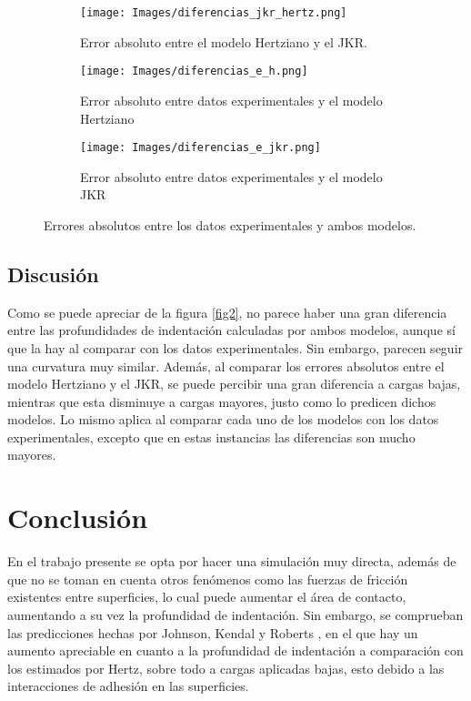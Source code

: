 \documentclass[final,6p,times,twocolumn]{elsarticle}
\begin{document}
\begin{figure}
\centering
    \begin{subfigure}[t]{0.49\textwidth}
         \centering
         \texttt{[image: Images/diferencias\_jkr\_hertz.png]}
         \caption{Error absoluto entre el modelo Hertziano y el JKR.}
         \label{fig3a}
     \end{subfigure}
     \begin{subfigure}[t]{0.49\textwidth}
         \centering
         \texttt{[image: Images/diferencias\_e\_h.png]}
         \caption{Error absoluto entre datos experimentales y el modelo Hertziano}
         \label{fig3b}
     \end{subfigure}
    \begin{subfigure}[t]{0.49\textwidth}
         \centering
         \texttt{[image: Images/diferencias\_e\_jkr.png]}
         \caption{Error absoluto entre datos experimentales y el modelo JKR}
         \label{fig3c}
     \end{subfigure}
    \caption{Errores absolutos entre los datos experimentales y ambos modelos.}
    \label{fig3}
\end{figure}

\subsection{Discusi\'on}
Como se puede apreciar de la figura \ref{fig2}, no parece haber una gran diferencia entre las profundidades de indentaci\'on calculadas por ambos modelos, aunque s\'i que la hay al comparar con los datos experimentales. Sin embargo, parecen seguir una curvatura muy similar. Adem\'as, al comparar los errores absolutos entre el modelo Hertziano y el JKR, se puede percibir una gran diferencia a cargas bajas, mientras que esta disminuye a cargas mayores, justo como lo predicen dichos modelos. Lo mismo aplica al comparar cada uno de los modelos con los datos experimentales, excepto que en estas instancias las diferencias son mucho mayores.

\section{Conclusi\'on}
En el trabajo presente se opta por hacer una simulaci\'on muy directa, adem\'as de que no se toman en cuenta otros fen\'omenos como las fuerzas de fricci\'on existentes entre superficies, lo cual puede aumentar el \'area de contacto, aumentando a su vez la profundidad de indentaci\'on. Sin embargo, se comprueban las predicciones hechas por Johnson, Kendal y Roberts , en el que hay un aumento apreciable en cuanto a la profundidad de indentaci\'on a comparaci\'on con los estimados por Hertz, sobre todo a cargas aplicadas bajas, esto debido a las interacciones de adhesi\'on en las superficies.
\end{document}
